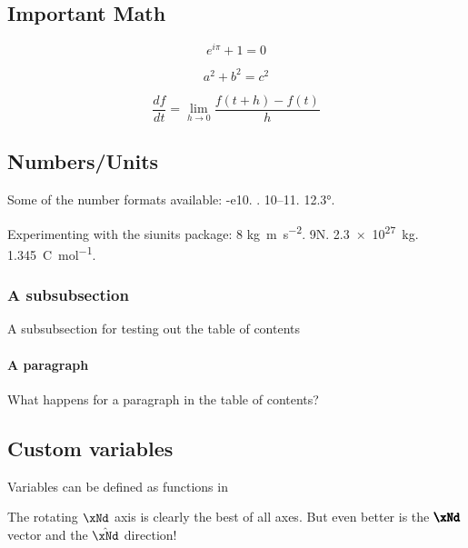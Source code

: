 \subsection{Important Math}

\begin{equation}
    e^{i\pi}+1=0
    \label{eq:euler}
\end{equation}

\begin{equation}
    a^2+b^2=c^2
    \label{eq:pythagorean}
\end{equation}

\begin{equation}
    \frac{df}{dt} = \lim_{h\rightarrow 0} \frac{f(t+h)-f(t)}{h}
    \label{eq:calculus}
\end{equation}

\subsection{Numbers/Units}
Some of the number formats available: \num{-e10}. . \numrange{10}{11}. \ang{12.3}.

Experimenting with the siunits package: 8 \unit{\kilo\gram\metre\per\square\second}. 9\unit{\newton}. \qty{2.3e27}{\kilogram}. \qty[per-mode = fraction]{1,345}{\coulomb\per\mole}.

\subsubsection{A subsubsection} 
A subsubsection for testing out the table of contents

\paragraph{A paragraph}
What happens for a paragraph in the table of contents?

\subsection{Custom variables}

Variables can be defined as functions in 

The rotating $\xNd$ axis is clearly the best of all axes. But even better is the $\vectorFmt{\xNd}$ vector and the $\unitVecFmt{\xNd}$ direction!

